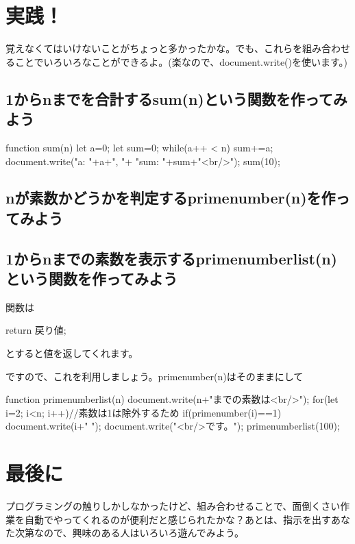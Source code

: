 \documentclass[mingoth,11pt,a4j,uplatex]{jsarticle}
\begin{document}
\section{実践！}
覚えなくてはいけないことがちょっと多かったかな。でも、これらを組み合わせることでいろいろなことができるよ。(楽なので、document.write()を使います。)


\subsection{1からnまでを合計するsum(n)という関数を作ってみよう}
\begin{verbatimtab}
function sum(n){
	let a=0;
	let sum=0;
	while(a++ < n){
		sum+=a;
		document.write("a: "+a+", "+ "sum: "+sum+"<br/>");
	}
}
sum(10);
\end{verbatimtab}

\subsection{nが素数かどうかを判定するprimenumber(n)を作ってみよう}

\subsection{1からnまでの素数を表示するprimenumberlist(n)という関数を作ってみよう}
関数は
\begin{center}
	return 戻り値;
\end{center}
とすると値を返してくれます。
ですので、これを利用しましょう。primenumber(n)はそのままにして
\begin{verbatimtab}
function primenumberlist(n){
	document.write(n+"までの素数は<br/>");
	for(let i=2; i<n; i++){//素数は1は除外するため
		if(primenumber(i)==1){
			document.write(i+" ");
		}
	}
	document.write("<br/>です。");
}
primenumberlist(100);
\end{verbatimtab}

\section*{最後に}
プログラミングの触りしかしなかったけど、組み合わせることで、面倒くさい作業を自動でやってくれるのが便利だと感じられたかな？あとは、指示を出すあなた次第なので、興味のある人はいろいろ遊んでみよう。

\end{document}
